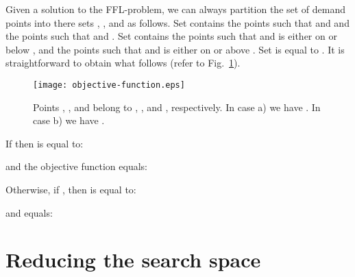 \documentclass[11pt,a4paper,oneside,onecolumn]{article}
\begin{document}
Given a solution  to the
FFL-problem, we can always partition the set  of demand points
into there sets , , and
 as follows. Set  contains the points 
such that  and  and the points 
such that  and . Set  contains the
points  such that  and  is either on or below
, and the points  such that  and  is either
on or above . Set  is equal to .
It is straightforward to obtain what follows (refer to Fig.~\ref{fig:expression-detail}).
\begin{figure}[h]
  \centering
  \texttt{[image: objective-function.eps]}
  \caption{\small{Points , , and  belong to , , and ,
  respectively. In case a) we have .
  In case b) we have .}}
  \label{fig:expression-detail}
\end{figure}

If  then  is equal to:

and the objective function  equals:

Otherwise, if , then
 is equal to:

and  equals:


\section{Reducing the search space}\label{section:discretization}
\end{document}
